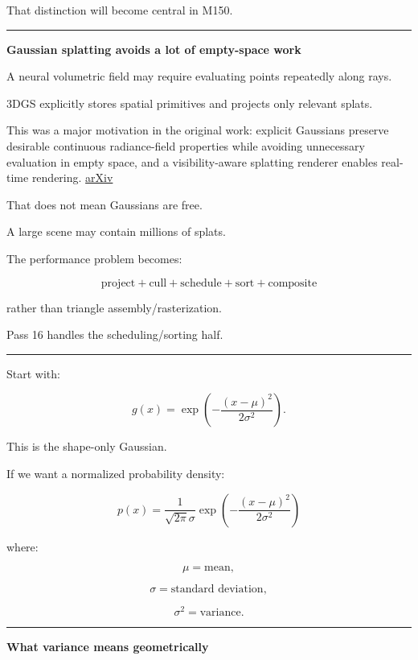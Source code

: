 That distinction will become central in M150.

\begin{center}\rule{0.5\linewidth}{0.5pt}\end{center}

\textbf{Gaussian splatting avoids a lot of empty-space work}

A neural volumetric field may require evaluating points repeatedly along rays.

3DGS explicitly stores spatial primitives and projects only relevant splats.

This was a major motivation in the original work: explicit Gaussians preserve desirable continuous radiance-field properties while avoiding unnecessary evaluation in empty space, and a visibility-aware splatting renderer enables real-time rendering. \href{https://arxiv.org/abs/2308.04079?utm_source=chatgpt.com}{arXiv}

That does not mean Gaussians are free.

A large scene may contain millions of splats.

The performance problem becomes:

\[
\boxed{
\text{project}
+
\text{cull}
+
\text{schedule}
+
\text{sort}
+
\text{composite}
}
\]

rather than triangle assembly/rasterization.

Pass 16 handles the scheduling/sorting half.

\begin{center}\rule{0.5\linewidth}{0.5pt}\end{center}

Start with:

\[
g(x)
=
\exp
\left(
-\frac{(x-\mu)^2}
{2\sigma^2}
\right).
\]

This is the shape-only Gaussian.

If we want a normalized probability density:

\[
\boxed{
p(x)
=
\frac{1}
{\sqrt{2\pi}\sigma}
\exp
\left(
-\frac{(x-\mu)^2}
{2\sigma^2}
\right)
}
\]

where:

\[
\mu=\text{mean},
\]

\[
\sigma=\text{standard deviation},
\]

\[
\sigma^2=\text{variance}.
\]

\begin{center}\rule{0.5\linewidth}{0.5pt}\end{center}

\textbf{What variance means geometrically}


